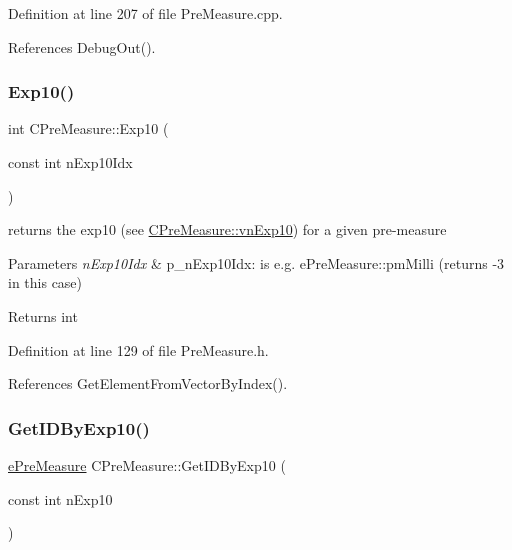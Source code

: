 Definition at line 207 of file Pre\+Measure.\+cpp.



References Debug\+Out().

\mbox{\label{classCPreMeasure_a1f6c35d76304a9eeb8105a53df63df0f}} 
\subsubsection{\texorpdfstring{Exp10()}{Exp10()}}
{\footnotesize\ttfamily int C\+Pre\+Measure\+::\+Exp10 (\begin{DoxyParamCaption}\item[{const int}]{n\+Exp10\+Idx }\end{DoxyParamCaption})\hspace{0.3cm}{\ttfamily [inline]}}



returns the exp10 (see \hyperlink{classCPreMeasure_a2c50eadae55427f0d77a013b3fab0fdb}{C\+Pre\+Measure\+::vn\+Exp10}) for a given pre-\/measure 


\begin{DoxyParams}{Parameters}
{\em n\+Exp10\+Idx} & p\+\_\+n\+Exp10\+Idx\+: is e.\+g. e\+Pre\+Measure\+::pm\+Milli (returns -\/3 in this case) \\
\hline
\end{DoxyParams}
\begin{DoxyReturn}{Returns}
int 
\end{DoxyReturn}


Definition at line 129 of file Pre\+Measure.\+h.



References Get\+Element\+From\+Vector\+By\+Index().

\mbox{\label{classCPreMeasure_a4f198103711ef15bac65a5011f32923e}} 
\subsubsection{\texorpdfstring{Get\+I\+D\+By\+Exp10()}{GetIDByExp10()}}
{\footnotesize\ttfamily \hyperlink{PreMeasure_8h_a6c81167b8d4c2badde42f81cb7214620}{e\+Pre\+Measure} C\+Pre\+Measure\+::\+Get\+I\+D\+By\+Exp10 (\begin{DoxyParamCaption}\item[{const int}]{n\+Exp10 }\end{DoxyParamCaption})}



